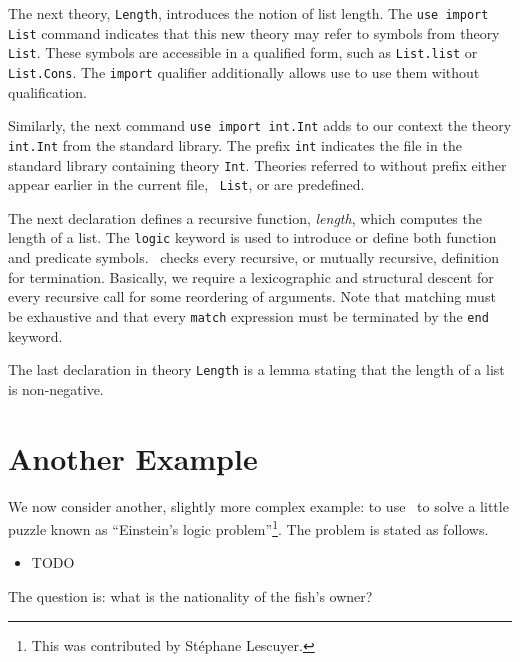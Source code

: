 The next theory, \texttt{Length}, introduces the notion of list
length. The \texttt{use import List} command indicates that this new
theory may refer to symbols from theory \texttt{List}. These symbols
are accessible in a qualified form, such as \texttt{List.list} or
\texttt{List.Cons}. The \texttt{import} qualifier additionally allows
use to use them without qualification.

Similarly, the next command \texttt{use import int.Int} adds to our
context the theory \texttt{int.Int} from the standard library. The
prefix \texttt{int} indicates the file in the standard library
containing theory \texttt{Int}. Theories referred to without prefix
either appear earlier in the current file, \eg\ \texttt{List}, or are
predefined. 

The next declaration defines a recursive function, \emph{length},
which computes the length of a list. The \texttt{logic} keyword is
used to introduce or define both function and predicate symbols. 
\why\ checks every recursive, or mutually recursive, definition for
termination. Basically, we require a lexicographic and structural
descent for every recursive call for some reordering of arguments. 
Note that matching must be exhaustive and that every \texttt{match}
expression must be terminated by the \texttt{end} keyword.

The last declaration in theory \texttt{Length} is a lemma stating that
the length of a list is non-negative. 




\section*{Another Example}

We now consider another, slightly more complex example: to use \why\
to solve a little puzzle known as ``Einstein's logic
problem''\footnote{This was contributed by St\'ephane Lescuyer.}.
The problem is stated as follows. 
\begin{itemize}
\item TODO
\end{itemize}
The question is: what is the nationality of the fish's owner?

